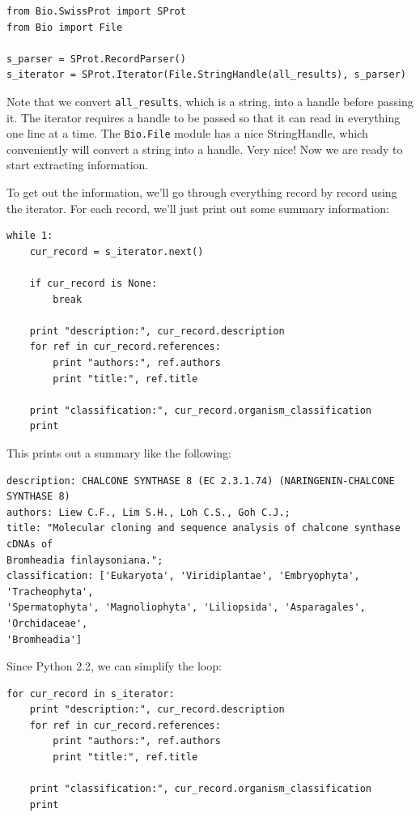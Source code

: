 \documentclass{report}
\begin{document}
\begin{verbatim}
from Bio.SwissProt import SProt
from Bio import File

s_parser = SProt.RecordParser()
s_iterator = SProt.Iterator(File.StringHandle(all_results), s_parser)
\end{verbatim}

Note that we convert \verb|all_results|, which is a string, into a handle before passing it. The iterator requires a handle to be passed so that it can read in everything one line at a time. The \verb|Bio.File| module has a nice StringHandle, which conveniently will convert a string into a handle. Very nice! Now we are ready to start extracting information.


To get out the information, we'll go through everything record by record using the iterator. For each record, we'll just print out some summary information:

\begin{verbatim}
while 1:
    cur_record = s_iterator.next()

    if cur_record is None:
        break

    print "description:", cur_record.description
    for ref in cur_record.references:
        print "authors:", ref.authors
        print "title:", ref.title

    print "classification:", cur_record.organism_classification
    print
\end{verbatim}

This prints out a summary like the following:

\begin{verbatim}
description: CHALCONE SYNTHASE 8 (EC 2.3.1.74) (NARINGENIN-CHALCONE SYNTHASE 8)
authors: Liew C.F., Lim S.H., Loh C.S., Goh C.J.;
title: "Molecular cloning and sequence analysis of chalcone synthase cDNAs of
Bromheadia finlaysoniana.";
classification: ['Eukaryota', 'Viridiplantae', 'Embryophyta', 'Tracheophyta', 
'Spermatophyta', 'Magnoliophyta', 'Liliopsida', 'Asparagales', 'Orchidaceae', 
'Bromheadia']
\end{verbatim}

Since Python 2.2, we can simplify the loop:

\begin{verbatim}
for cur_record in s_iterator:
    print "description:", cur_record.description
    for ref in cur_record.references:
        print "authors:", ref.authors
        print "title:", ref.title

    print "classification:", cur_record.organism_classification
    print
\end{verbatim}
\end{document}
